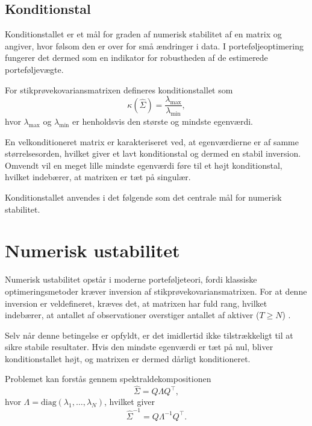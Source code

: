 \documentclass[../main.tex]{subfiles}
\begin{document}
\subsection{Konditionstal}

Konditionstallet er et mål for graden af numerisk stabilitet af en matrix og angiver, hvor følsom den er over for små ændringer i data. I porteføljeoptimering fungerer det dermed som en indikator for robustheden af de estimerede porteføljevægte.

For stikprøvekovariansmatrixen defineres konditionstallet som
\begin{equation}
    \kappa(\hat{\Sigma})=\frac{\lambda_{\max}}{\lambda_{\min}},
\end{equation}
hvor $\lambda_{\max}$ og $\lambda_{\min}$ er henholdsvis den største og mindste egenværdi.

En velkonditioneret matrix er karakteriseret ved, at egenværdierne er af samme størrelsesorden, hvilket giver et lavt konditionstal og dermed en stabil inversion. Omvendt vil en meget lille mindste egenværdi føre til et højt konditionstal, hvilket indebærer, at matrixen er tæt på singulær.

Konditionstallet anvendes i det følgende som det centrale mål for numerisk stabilitet.


\section{Numerisk ustabilitet}


Numerisk ustabilitet opstår i moderne porteføljeteori, fordi klassiske optimeringsmetoder kræver inversion af stikprøvekovariansmatrixen. For at denne inversion er veldefineret, kræves det, at matrixen har fuld rang, hvilket indebærer, at antallet af observationer overstiger antallet af aktiver ($T \geq N$) \cite{potters_financial_2005}.

Selv når denne betingelse er opfyldt, er det imidlertid ikke tilstrækkeligt til at sikre stabile resultater. Hvis den mindste egenværdi er tæt på nul, bliver konditionstallet højt, og matrixen er dermed dårligt konditioneret.

Problemet kan forstås gennem spektraldekompositionen
\begin{equation}
    \hat{\Sigma} = Q \Lambda Q^\top,
\end{equation}
hvor $\Lambda = \mathrm{diag}(\lambda_1, \ldots, \lambda_N)$, hvilket giver
\begin{equation}
    \hat{\Sigma}^{-1} = Q \Lambda^{-1} Q^\top.
\end{equation}
\end{document}
